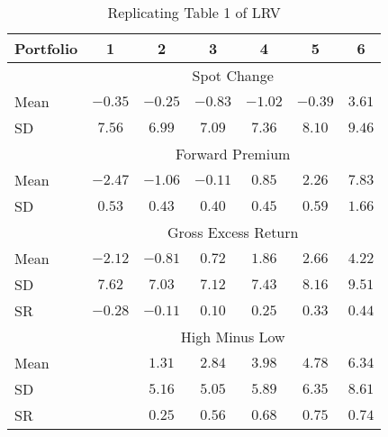 \documentclass[a4paper]{article}
\begin{document}
\begin{table}[htbp]
\centering
\caption{Replicating Table 1 of LRV}
\begin{tabular}{ l |c c c c c c } 
Portfolio & 1 & 2 & 3 & 4 & 5 & 6 \\
\hline \hline
& \multicolumn{6}{c}{Spot Change} \\
Mean & $ -0.35$ & $ -0.25$ & $ -0.83$ & $ -1.02$ & $ -0.39$ & $  3.61$ \\
SD & $  7.56$ & $  6.99$ & $  7.09$ & $  7.36$ & $  8.10$ & $  9.46$ \\
&\multicolumn{6}{c}{Forward Premium} \\
Mean & $ -2.47$ & $ -1.06$ & $ -0.11$ & $  0.85$ & $  2.26$ & $  7.83$ \\
SD & $  0.53$ & $  0.43$ & $  0.40$ & $  0.45$ & $  0.59$ & $  1.66$ \\
&\multicolumn{6}{c}{Gross Excess Return} \\
Mean & $ -2.12$ & $ -0.81$ & $  0.72$ & $  1.86$ & $  2.66$ & $  4.22$ \\
SD & $  7.62$ & $  7.03$ & $  7.12$ & $  7.43$ & $  8.16$ & $  9.51$ \\
SR & $ -0.28$ & $ -0.11$ & $  0.10$ & $  0.25$ & $  0.33$ & $  0.44$ \\
&\multicolumn{6}{c}{High Minus Low} \\
Mean& & $  1.31$ & $  2.84$ & $  3.98$ & $  4.78$ & $  6.34$ \\
SD& & $  5.16$ & $  5.05$ & $  5.89$ & $  6.35$ & $  8.61$ \\
SR& & $  0.25$ & $  0.56$ & $  0.68$ & $  0.75$ & $  0.74$ 
\end{tabular}
\end{table}
\end{document}
